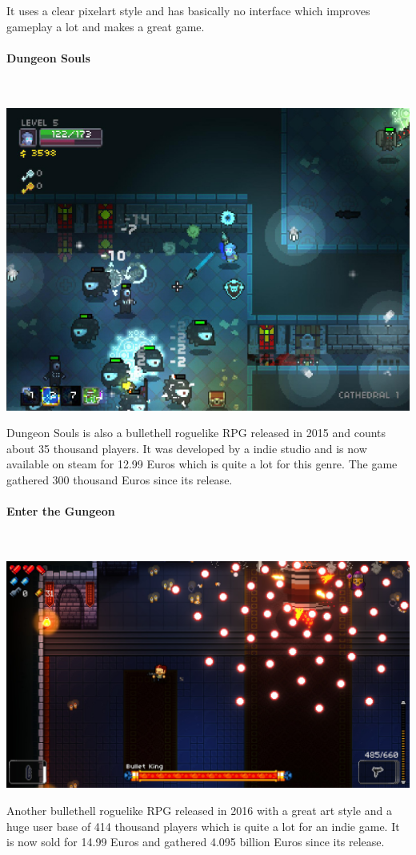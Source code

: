 \documentclass[11pt]{article}
\begin{document}
It uses a clear pixelart style and has basically no interface which improves gameplay a lot and makes a great game.

\newpage

\paragraph{Dungeon Souls}~\\
\begin{center}
 \includegraphics[width=\textwidth]{./dungeon.jpg}
\end{center}
Dungeon Souls is also a bullethell roguelike RPG released in 2015 and counts about 35 thousand players. It was developed by a indie studio and is now available on steam for 12.99 Euros which is quite a lot for this genre. 
The game gathered 300 thousand Euros since its release.

\newpage

\paragraph{Enter the Gungeon}~\\
\begin{center}
 \includegraphics[width=\textwidth]{./gungeon.jpg}
\end{center}
Another bullethell roguelike RPG released in 2016 with a great art style and a huge user base of 414 thousand players which is quite a lot for an indie game. 
It is now sold for 14.99 Euros and gathered 4.095 billion Euros since its release.
\end{document}
